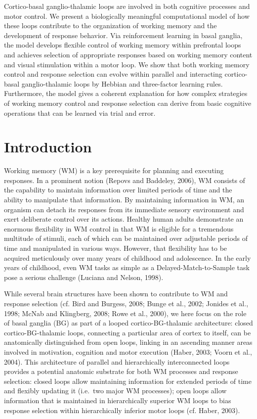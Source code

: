 \documentclass[
  11pt,
  a4paper,
]{scrbook}
\begin{document}
Cortico-basal ganglio-thalamic loops are involved in both cognitive
processes and motor control. We present a biologically meaningful
computational model of how these loops contribute to the organization of
working memory and the development of response behavior. Via
reinforcement learning in basal ganglia, the model develops flexible
control of working memory within prefrontal loops and achieves selection
of appropriate responses based on working memory content and visual
stimulation within a motor loop. We show that both working memory
control and response selection can evolve within parallel and
interacting cortico-basal ganglio-thalamic loops by Hebbian and
three-factor learning rules. Furthermore, the model gives a coherent
explanation for how complex strategies of working memory control and
response selection can derive from basic cognitive operations that can
be learned via trial and error.

\section{Introduction}\label{introduction-2}

Working memory (WM) is a key prerequisite for planning and executing
responses. In a prominent notion (Repovs and Baddeley, 2006), WM
consists of the capability to maintain information over limited periods
of time and the ability to manipulate that information. By maintaining
information in WM, an organism can detach its responses from its
immediate sensory environment and exert deliberate control over its
actions. Healthy human adults demonstrate an enormous flexibility in WM
control in that WM is eligible for a tremendous multitude of stimuli,
each of which can be maintained over adjustable periods of time and
manipulated in various ways. However, that flexibility has to be
acquired meticulously over many years of childhood and adolescence. In
the early years of childhood, even WM tasks as simple as a
Delayed-Match-to-Sample task pose a serious challenge (Luciana and
Nelson, 1998).

While several brain structures have been shown to contribute to WM and
response selection (cf. Bird and Burgess, 2008; Bunge et al., 2002;
Jonides et al., 1998; McNab and Klingberg, 2008; Rowe et al., 2000), we
here focus on the role of basal ganglia (BG) as part of a looped
cortico-BG-thalamic architecture: closed cortico-BG-thalamic loops,
connecting a particular area of cortex to itself, can be anatomically
distinguished from open loops, linking in an ascending manner areas
involved in motivation, cognition and motor execution (Haber, 2003;
Voorn et al., 2004). This architecture of parallel and hierarchically
interconnected loops provides a potential anatomic substrate for both WM
processes and response selection: closed loops allow maintaining
information for extended periods of time and flexibly updating it
(i.e.~two major WM processes); open loops allow information that is
maintained in hierarchically superior WM loops to bias response
selection within hierarchically inferior motor loops (cf. Haber, 2003).
\end{document}
